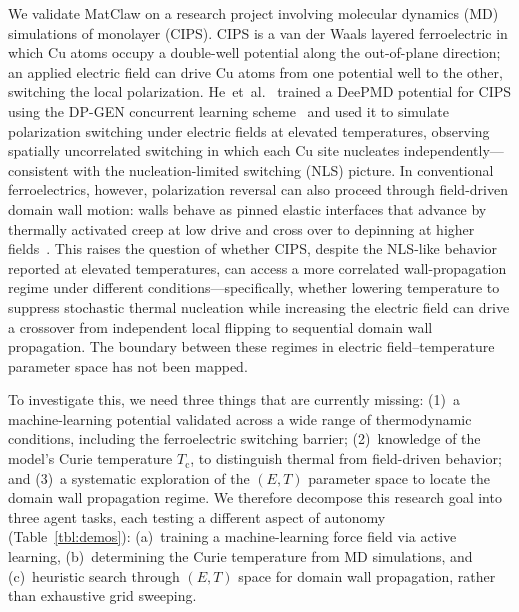 \documentclass{article}
\begin{document}
We validate MatClaw on a research project involving molecular dynamics (MD) simulations of monolayer  (CIPS).
CIPS is a van der Waals layered ferroelectric in which Cu atoms occupy a double-well potential along the out-of-plane direction; an applied electric field can drive Cu atoms from one potential well to the other, switching the local polarization.
He~et~al.~\citep{He2023} trained a DeePMD potential for CIPS using the DP-GEN concurrent learning scheme~\citep{Zhang2020dpgen} and used it to simulate polarization switching under electric fields at elevated temperatures, observing spatially uncorrelated switching in which each Cu site nucleates independently---consistent with the nucleation-limited switching (NLS) picture.
In conventional ferroelectrics, however, polarization reversal can also proceed through field-driven domain wall motion: walls behave as pinned elastic interfaces that advance by thermally activated creep at low drive and cross over to depinning at higher fields~\citep{Paruch2013,Liu2016nature}.
This raises the question of whether CIPS, despite the NLS-like behavior reported at elevated temperatures, can access a more correlated wall-propagation regime under different conditions---specifically, whether lowering temperature to suppress stochastic thermal nucleation while increasing the electric field can drive a crossover from independent local flipping to sequential domain wall propagation.
The boundary between these regimes in electric field--temperature parameter space has not been mapped.

To investigate this, we need three things that are currently missing: (1)~a machine-learning potential validated across a wide range of thermodynamic conditions, including the ferroelectric switching barrier; (2)~knowledge of the model's Curie temperature $T_\mathrm{c}$, to distinguish thermal from field-driven behavior; and (3)~a systematic exploration of the $(E, T)$ parameter space to locate the domain wall propagation regime.
We therefore decompose this research goal into three agent tasks, each testing a different aspect of autonomy (Table~\ref{tbl:demos}):
(a)~training a machine-learning force field via active learning,
(b)~determining the Curie temperature from MD simulations, and
(c)~heuristic search through $(E, T)$ space for domain wall propagation, rather than exhaustive grid sweeping.
\end{document}
